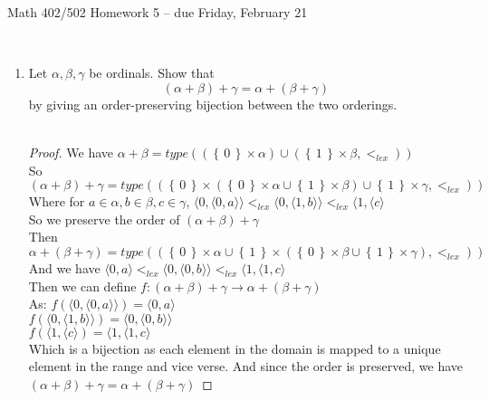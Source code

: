 \documentclass[11pt]{amsart}
\newcommand{\set}[1]{\left\{\,#1\,\right\}}
\begin{document}
\begin{center}
{\Large Math 402/502 Homework 5 -- due Friday, February 21}
\ \\
\end{center}

\ \\
 
 \begin{enumerate}



\item  Let $\alpha, \beta, \gamma$ be ordinals. Show that
\[ (\alpha + \beta) + \gamma = \alpha + (\beta + \gamma) \]
by giving an order-preserving bijection between the two orderings.
\\
\\
\begin{proof}
We have
$\alpha + \beta = type((\set{0} \times \alpha ) \cup (\set{1} \times \beta, <_{lex}))$ \\
So $(\alpha + \beta) + \gamma = type((\set{0} \times (\set{0} \times \alpha \cup \set{1} \times \beta) \cup \set{1} \times \gamma, <_{lex}))$ \\
Where for $a \in \alpha, b \in \beta, c \in \gamma$, $\langle 0, \langle 0, a \rangle \rangle <_{lex} \langle 0, \langle 1, b \rangle \rangle <_{lex} \langle 1, \langle c \rangle$ \\
So we preserve the order of $(\alpha + \beta) + \gamma$\\
Then $\alpha + (\beta + \gamma) = type((\set{0} \times \alpha \cup \set{1} \times (\set{0} \times \beta \cup \set{1} \times \gamma), <_{lex}))$ \\
And we have $\langle 0, a \rangle <_{lex} \langle 0, \langle 0, b \rangle \rangle <_{lex} \langle 1, \langle 1, c \rangle$ \\
Then we can define $f : (\alpha + \beta) + \gamma \rightarrow \alpha + (\beta + \gamma)$ \\
As: $f(\langle 0, \langle 0, a \rangle \rangle) = \langle 0, a \rangle$ \\
$f(\langle 0, \langle 1, b \rangle \rangle) = \langle 0, \langle 0, b \rangle \rangle$ \\
$f(\langle 1, \langle c \rangle) = \langle 1, \langle 1, c \rangle$ \\
Which is a bijection as each element in the domain is mapped to a unique element in the range and vice verse.
And since the order is preserved, we have $(\alpha + \beta) + \gamma = \alpha + (\beta + \gamma)$
\end{proof}


\end{enumerate}
\end{document}
